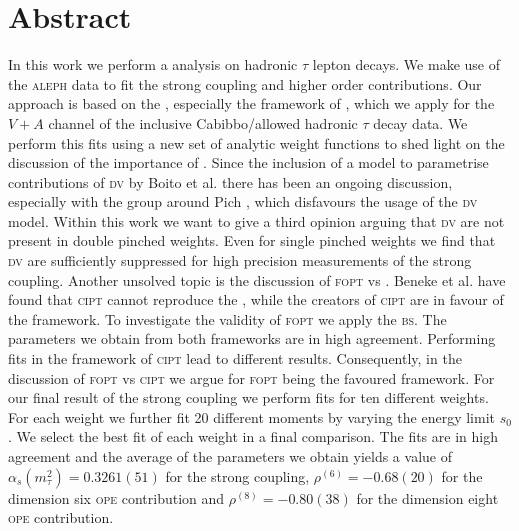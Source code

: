 \documentclass[../../index.tex]{subfiles}
\begin{document}
\chapter*{Abstract}
In this work we perform a  analysis on
hadronic \(\tau\) lepton decays. We make use of the \textsc{aleph} data to fit
the strong coupling and higher order 
contributions. Our approach is based on the , especially the framework of , which we apply for the \(V+A\) channel of the inclusive
Cabibbo\-/allowed hadronic \(\tau\) decay data. We perform this fits using a new
set of analytic weight functions to shed light on the discussion of the
importance of . Since the inclusion of a model to
parametrise contributions of \textsc{dv} by Boito et al. \cite{2011a} there has
been an ongoing discussion, especially with the group around Pich
\cite{Pich2016}, which disfavours the usage of the \textsc{dv} model. Within
this work we want to give a third opinion arguing that \textsc{dv} are not
present in double pinched weights. Even for single pinched weights we find that
\textsc{dv} are sufficiently suppressed for high precision measurements of the
strong coupling. Another unsolved topic is the discussion of \textsc{fopt} vs
. Beneke et al.
\cite{Beneke2008} have found that \textsc{cipt} cannot reproduce the
, while the creators of \textsc{cipt}
\cite{Pivovarov1991, LeDiberder1992a} are in favour of the framework. To
investigate the validity of \textsc{fopt} we apply the \textsc{bs}. The
parameters we obtain from both frameworks are in high agreement. Performing fits
in the framework of \textsc{cipt} lead to different results. Consequently, in
the discussion of \textsc{fopt} vs \textsc{cipt} we argue for \textsc{fopt}
being the favoured framework. For our final result of the strong coupling we
perform fits for ten different weights. For each weight we further fit 20
different moments by varying the energy limit \(s_0\). We select the best fit of
each weight in a final comparison. The fits are in high agreement and the
average of the parameters we obtain yields a value of \(\alpha_s(m_\tau^2) =
0.3261(51) \) for the strong coupling, \(\rho^{(6)} = -0.68(20)\) for the
dimension six \textsc{ope} contribution and \(\rho^{(8)} = -0.80(38) \) for the
dimension eight \textsc{ope} contribution.
\end{document}
